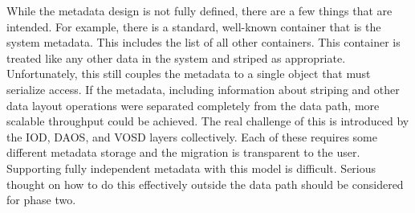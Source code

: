 \documentclass[conference]{IEEEtran}
\newcommand{\DDT}{D\textsuperscript{2}T~}
\begin{document}
While the metadata design is not fully defined, there are a few things that
are intended. For example, there is a standard, well-known container that is
the system metadata. This includes the list of all other containers. This
container is treated like any other data in the system and striped as
appropriate. Unfortunately, this still couples the metadata to a single object
that must serialize access. If the metadata, including information about
striping and other data layout operations were separated completely from the
data path, more scalable throughput could be achieved. The real challenge of
this is introduced by the IOD, DAOS, and VOSD layers collectively. Each of
these requires some different metadata storage and the migration is transparent
to the user.  Supporting fully independent metadata with this model is
difficult. Serious thought on how to do this effectively outside the data path
should be considered for phase two.

%
%
%
\end{document}
